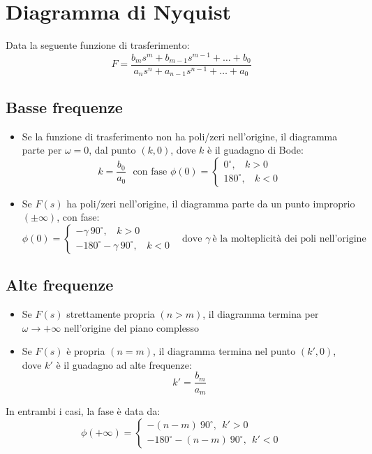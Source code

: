 \documentclass{report}
\theoremstyle{nostyle}
\begin{document}
\section{Diagramma di Nyquist}
Data la seguente funzione di trasferimento:
\[      F = \frac{b_m s^m+b_{m-1}s^{m-1}+\dots+b_0}{a_n s^n+ a_{n-1}s^{n-1}+ \dots + a_0}    \]

\subsection{Basse frequenze}
\begin{itemize}
    \item Se la funzione di trasferimento non ha poli/zeri nell'origine, il diagramma parte per $\omega = 0$, dal punto $(k,0)$, dove $k$ è il guadagno di Bode:
    \[    k = \frac{b_0}{a_0}  \ \ \ \text{con fase  } \phi(0)= \begin{cases}
        0^\circ,\ \ \ \ k>0\\
        180^\circ, \ \ \ \ k<0 
    \end{cases}   \]
    \item Se $F(s)$ ha poli/zeri nell'origine, il diagramma parte da un punto improprio $(\pm \infty)$, con fase:
    \[    \phi(0) = \begin{cases}
        -\gamma\ 90^\circ, \ \ \ \ k >0\\
        -180^\circ-\gamma \ 90^\circ,\ \ \ \ k<0
    \end{cases}    \ \ \ \ \text{dove } \gamma \ \text{è la molteplicità dei poli nell'origine}      \]
\end{itemize}


\subsection{Alte frequenze}
\begin{itemize}
    \item Se $F(s)$ strettamente propria $(n>m)$, il diagramma termina per $\omega \to +\infty$ nell'origine del piano complesso
    \item Se $F(s)$ è propria $(n = m)$, il diagramma termina nel punto $(k',0)$, dove $k'$ è il guadagno ad alte frequenze:
    \[    k' = \frac{b_m}{a_m}          \]
\end{itemize}
In entrambi i casi, la fase è data da:
\[       \phi (+\infty) = \begin{cases}
    -(n-m)\ 90^\circ,\ \ k'>0\\
    -180^\circ - (n-m)\ 90^\circ, \ \ k'<0
\end{cases}       \]
\end{document}
